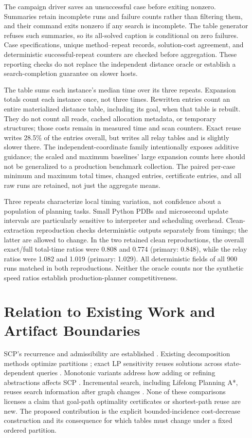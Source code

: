 The campaign driver saves an unsuccessful case before exiting nonzero. Summaries retain incomplete runs and failure counts rather than filtering them, and their command exits nonzero if any search is incomplete. The table generator refuses such summaries, so its all-solved caption is conditional on zero failures. Case specifications, unique method--repeat records, solution-cost agreement, and deterministic successful-repeat counters are checked before aggregation. These reporting checks do not replace the independent distance oracle or establish a search-completion guarantee on slower hosts.



The table sums each instance's median time over its three repeats. Expansion totals count each instance once, not three times. Rewritten entries count an entire materialized distance table, including its goal, when that table is rebuilt. They do not count all reads, cached allocation metadata, or temporary structures; those costs remain in measured time and scan counters. Exact reuse writes 28.5\% of the entries overall, but writes all relay tables and is slightly slower there. The independent-coordinate family intentionally exposes additive guidance; the scaled and maximum baselines' large expansion counts here should not be generalized to a production benchmark collection. The paired per-case minimum and maximum total times, changed entries, certificate entries, and all raw runs are retained, not just the aggregate means.

Three repeats characterize local timing variation, not confidence about a population of planning tasks. Small Python PDBs and microsecond update intervals are particularly sensitive to interpreter and scheduling overhead. Clean-extraction reproduction checks deterministic outputs separately from timings; the latter are allowed to change. In the two retained clean reproductions, the overall exact/full total-time ratios were 0.808 and 0.774 (primary: 0.848), while the relay ratios were 1.082 and 1.019 (primary: 1.029). All deterministic fields of all 900 runs matched in both reproductions. Neither the oracle counts nor the synthetic speed ratios establish production-planner competitiveness.

\section{Relation to Existing Work and Artifact Boundaries}
SCP's recurrence and admissibility are established \citep{comparison2017}. Existing decomposition methods optimize partitions \citep{dw2021}; exact LP sensitivity reuses solutions across state-dependent queries \citep{sensitivity2024}. Monotonic variants address how adding or refining abstractions affects SCP \citep{monotonic2026}. Incremental search, including Lifelong Planning A*, reuses search information after graph changes \citep{lpa2004}. None of these comparisons licenses a claim that goal-path optimality certificates or shortest-path reuse are new. The proposed contribution is the explicit bounded-incidence cost-decrease construction and its consequence for which tables must change under a fixed ordered partition.

